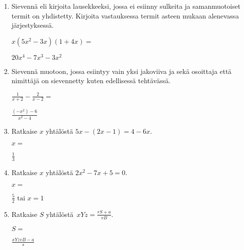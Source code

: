 \documentclass[finnish, a4paper, 12pt]{article}
\begin{document}
\begin{enumerate}[leftmargin=*]
		\vspace{8pt}
		
		\item %
		Sievennä eli kirjoita lausekkeeksi, jossa ei esiinny sulkeita ja 
		samanmuotoiset termit on yhdistetty. 
		Kirjoita vastauksessa termit asteen mukaan alenevassa järjestyksessä. 
		
		\(
		\displaystyle
		x(5x^2 - 3x)(1 + 4x) = 
		\) %
		\begin{version:withAnswers}
		\( 20x^4 -7x^3 -3x^2 \)
		\end{version:withAnswers}
		
		\vspace{8pt}
		
		\item %
		Sievennä %
		muotoon, jossa esiintyy vain yksi jakoviiva ja sekä osoittaja
		että nimittäjä on sievennetty kuten edellisessä tehtävässä.
		
		\(
		\displaystyle
		\frac{1}{x+2}- \frac{2}{x - 2} =
		\) %
		\begin{version:withAnswers}
		\( \frac{(- x^2) - 6}{x^2  - 4} \)
		\end{version:withAnswers}
		
		\vspace{8pt}
		
		\item %
		Ratkaise \(x\) yhtälöstä \(5x - (2x-1) = 4 - 6x\).
		
		\(
		x = 
		\)	%
		\begin{version:withAnswers}
		 \( \frac{1}{3} \)
		\end{version:withAnswers}
		\vspace{8pt}
		
		\item %
		Ratkaise \(x\) yhtälöstä \(2 x^2  - 7 x + 5= 0\).
		
		\(
		x = 		
		\)	%
		
		\begin{version:withAnswers}
		\(\frac{5}{2} \text{  tai } x = 1\)
		\end{version:withAnswers}
		\vspace{8pt}
		
		\item %
		Ratkaise \(S\) yhtälöstä 
		\(
		\displaystyle \,
		xYz = \frac{rS+a}{vB} .
		\)	
		
		\(
		S = 
		\) %
		\begin{version:withAnswers}
		\( \frac{xYzvB-a}{s}\)
		\end{version:withAnswers}
		
	\end{enumerate}
	
	
\end{document}
